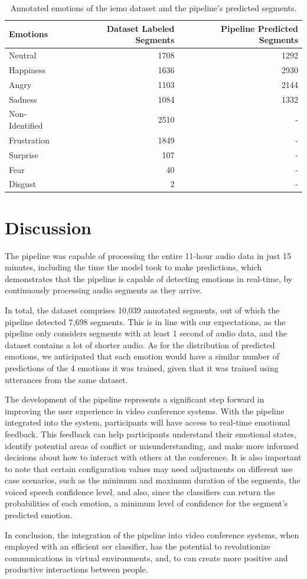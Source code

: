 \begin{table}[H]
	\centering
	\caption{Annotated emotions of the \ac{iemo} dataset and the pipeline's predicted segments.}
	\label{tab:iemopipeline}
	\begin{tabular}{lrr}
		\toprule
		Emotions & Dataset Labeled Segments & Pipeline Predicted Segments \\
		\midrule
		Neutral & 1708 & 1292 \\
		Happiness & 1636 & 2930 \\
		Angry & 1103 & 2144 \\
		Sadness & 1084 & 1332 \\
		Non-Identified & 2510 & - \\
		Frustration & 1849 & - \\
		Surprise	& 107 & - \\
		Fear & 40 & - \\
		Disgust & 2 & - \\
		\bottomrule
	\end{tabular}
\end{table}

\section{Discussion}

The pipeline was capable of processing the entire 11-hour audio data in just 15 minutes, including the time the model took to make predictions, which demonstrates that the pipeline is capable of detecting emotions in real-time, by continuously processing audio segments as they arrive.

In total, the dataset comprises 10,039 annotated segments, out of which the pipeline detected 7,698 segments. This is in line with our expectations, as the pipeline only considers segments with at least 1 second of audio data, and the dataset contains a lot of shorter audio. As for the distribution of predicted emotions, we anticipated that each emotion would have a similar number of predictions of the 4 emotions it was trained, given that it was trained using utterances from the same dataset.

The development of the pipeline represents a significant step forward in improving the user experience in video conference systems. With the pipeline integrated into the system, participants will have access to real-time emotional feedback. This feedback can help participants understand their emotional states, identify potential areas of conflict or misunderstanding, and make more informed decisions about how to interact with others at the conference. It is also important to note that certain configuration values may need adjustments on different use case scenarios, such as the minimum and maximum duration of the segments, the voiced speech confidence level, and also, since the classifiers can return the probabilities of each emotion, a minimum level of confidence for the segment's predicted emotion.

In conclusion, the integration of the pipeline into video conference systems, when employed with an efficient \ac{ser} classifier, has the potential to revolutionize communications in virtual environments, and, to can create more positive and productive interactions between people.
